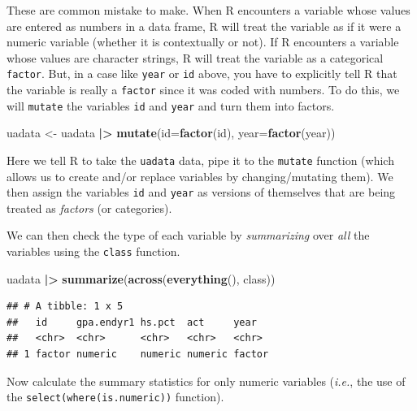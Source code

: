 \documentclass[
]{book}
\newenvironment{Shaded}{\begin{snugshade}}{\end{snugshade}}
\newcommand{\AttributeTok}[1]{\textcolor[rgb]{0.13,0.29,0.53}{#1}}
\newcommand{\FunctionTok}[1]{\textcolor[rgb]{0.13,0.29,0.53}{\textbf{#1}}}
\newcommand{\NormalTok}[1]{#1}
\newcommand{\OtherTok}[1]{\textcolor[rgb]{0.56,0.35,0.01}{#1}}
\newcommand{\SpecialCharTok}[1]{\textcolor[rgb]{0.81,0.36,0.00}{\textbf{#1}}}
\begin{document}
These are common mistake to make. When R encounters a variable whose values are entered as numbers in a data frame, R will treat the variable as if it were a numeric variable (whether it is contextually or not).
If R encounters a variable whose values are character strings, R will treat the variable as a categorical \texttt{factor}.
But, in a case like \texttt{year} or \texttt{id} above, you have to explicitly tell R that the variable is really a \texttt{factor} since it was coded with numbers.
To do this, we will \texttt{mutate} the variables \texttt{id} and \texttt{year} and turn them into factors.

\begin{Shaded}
\begin{Highlighting}[]
\NormalTok{uadata }\OtherTok{\textless{}{-}}\NormalTok{ uadata }\SpecialCharTok{|\textgreater{}}
  \FunctionTok{mutate}\NormalTok{(}\AttributeTok{id=}\FunctionTok{factor}\NormalTok{(id),}
         \AttributeTok{year=}\FunctionTok{factor}\NormalTok{(year))}
\end{Highlighting}
\end{Shaded}

Here we tell R to take the \texttt{uadata} data, pipe it to the \texttt{mutate} function (which allows us to create and/or replace variables by changing/mutating them). We then assign the variables \texttt{id} and \texttt{year} as versions of themselves that are being treated as \emph{factors} (or categories).

We can then check the type of each variable by \emph{summarizing} over \emph{all} the variables using the \texttt{class} function.

\begin{Shaded}
\begin{Highlighting}[]
\NormalTok{uadata }\SpecialCharTok{|\textgreater{}}
  \FunctionTok{summarize}\NormalTok{(}\FunctionTok{across}\NormalTok{(}\FunctionTok{everything}\NormalTok{(), class))}
\end{Highlighting}
\end{Shaded}

\begin{verbatim}
## # A tibble: 1 x 5
##   id     gpa.endyr1 hs.pct  act     year  
##   <chr>  <chr>      <chr>   <chr>   <chr> 
## 1 factor numeric    numeric numeric factor
\end{verbatim}

Now calculate the summary statistics for only numeric variables (\emph{i.e.}, the use of the \texttt{select(where(is.numeric))} function).
\end{document}
